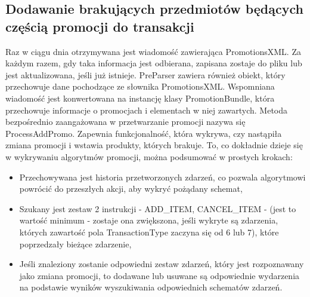 \documentclass[a4paper]{book}
\begin{document}
\subsection{Dodawanie brakujących przedmiotów będących częścią promocji do transakcji}
Raz w ciągu dnia otrzymywana jest wiadomość zawierająca PromotionsXML. Za każdym razem, gdy taka informacja jest odbierana, zapisana zostaje do pliku lub jest aktualizowana, jeśli już istnieje. PreParser zawiera również obiekt, który przechowuje dane pochodzące ze słownika PromotionsXML. Wspomniana wiadomość jest konwertowana na instancję klasy PromotionBundle, która przechowuje informacje o promocjach i elementach w niej zawartych. Metoda bezpośrednio zaangażowana w przetwarzanie promocji nazywa się ProcessAddPromo. Zapewnia funkcjonalność, która wykrywa, czy nastąpiła zmiana promocji i wstawia produkty, których brakuje. To, co dokładnie dzieje się w wykrywaniu algorytmów promocji, można podsumować w prostych krokach:
\begin{itemize}
	\item Przechowywana jest historia przetworzonych zdarzeń, co pozwala algorytmowi powrócić do przeszłych akcji, aby wykryć pożądany schemat,
	\item Szukany jest zestaw 2 instrukcji - ADD\_ITEM, CANCEL\_ITEM - (jest to wartość minimum - zostaje ona zwiększona, jeśli wykryte są zdarzenia, których zawartość pola TransactionType zaczyna się od 6 lub 7), które poprzedzały bieżące zdarzenie,
	\item Jeśli znaleziony zostanie odpowiedni zestaw zdarzeń, który jest rozpoznawany jako zmiana promocji, to dodawane lub usuwane są odpowiednie wydarzenia na podstawie wyników wyszukiwania odpowiednich schematów zdarzeń.
\end{itemize}
\end{document}
